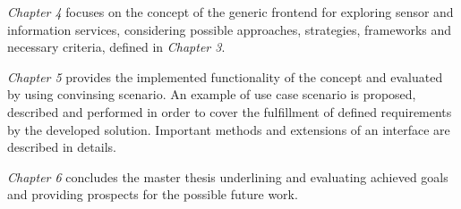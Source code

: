 \emph{Chapter 4} focuses on the concept of the generic frontend for exploring sensor and information services, considering possible approaches, strategies, frameworks and necessary criteria, defined in \emph{Chapter 3}.

\emph{Chapter 5} provides the implemented functionality of the concept and evaluated by using convinsing scenario. An example of use case scenario is proposed, described and performed in order to cover the fulfillment of defined requirements by the developed solution. Important methods and extensions of an interface are described in details.

\emph{Chapter 6} concludes the master thesis underlining and evaluating achieved goals and providing prospects for the possible future work.  
